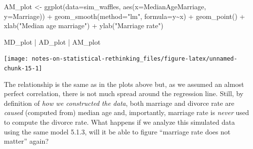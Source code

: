 \documentclass[
]{book}
\newenvironment{Shaded}{\begin{snugshade}}{\end{snugshade}}
\newcommand{\AttributeTok}[1]{\textcolor[rgb]{0.77,0.63,0.00}{#1}}
\newcommand{\FunctionTok}[1]{\textcolor[rgb]{0.00,0.00,0.00}{#1}}
\newcommand{\NormalTok}[1]{#1}
\newcommand{\OtherTok}[1]{\textcolor[rgb]{0.56,0.35,0.01}{#1}}
\newcommand{\SpecialCharTok}[1]{\textcolor[rgb]{0.00,0.00,0.00}{#1}}
\newcommand{\StringTok}[1]{\textcolor[rgb]{0.31,0.60,0.02}{#1}}
\begin{document}
\begin{Shaded}
\begin{Highlighting}[]
\NormalTok{AM\_plot }\OtherTok{\textless{}{-}} 
  \FunctionTok{ggplot}\NormalTok{(}\AttributeTok{data=}\NormalTok{sim\_waffles, }\FunctionTok{aes}\NormalTok{(}\AttributeTok{x=}\NormalTok{MedianAgeMarriage, }\AttributeTok{y=}\NormalTok{Marriage)) }\SpecialCharTok{+} 
  \FunctionTok{geom\_smooth}\NormalTok{(}\AttributeTok{method=}\StringTok{"lm"}\NormalTok{, }\AttributeTok{formula=}\NormalTok{y}\SpecialCharTok{\textasciitilde{}}\NormalTok{x) }\SpecialCharTok{+} 
  \FunctionTok{geom\_point}\NormalTok{() }\SpecialCharTok{+} 
  \FunctionTok{xlab}\NormalTok{(}\StringTok{"Median age marriage"}\NormalTok{) }\SpecialCharTok{+} 
  \FunctionTok{ylab}\NormalTok{(}\StringTok{"Marriage rate"}\NormalTok{)}

\NormalTok{MD\_plot }\SpecialCharTok{|}\NormalTok{ AD\_plot }\SpecialCharTok{|}\NormalTok{ AM\_plot}
\end{Highlighting}
\end{Shaded}

\begin{center}\texttt{[image: notes-on-statistical-rethinking\_files/figure-latex/unnamed-chunk-15-1]} \end{center}

The relationship is the same as in the plots above but, as we assumed an almost perfect correlation, there is not much spread around the regression line. Still, by definition of \emph{how we constructed the data}, both marriage and divorce rate are \emph{caused} (computed from) median age and, importantly, marriage rate is \emph{never} used to compute the divorce rate. What happens if we analyze this simulated data using the same model 5.1.3, will it be able to figure ``marriage rate does not matter'' again?
\end{document}
